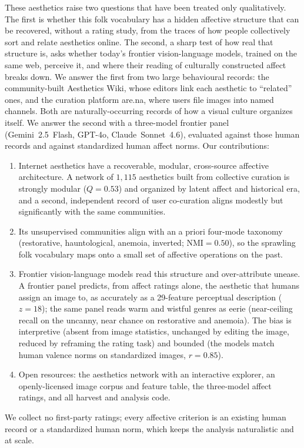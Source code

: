 \documentclass[11pt]{article}
\begin{document}
These aesthetics raise two questions that have been treated only qualitatively. The first is
whether this folk vocabulary has a hidden affective structure that can be recovered, without a
rating study, from the traces of how people collectively sort and relate aesthetics online. The
second, a sharp test of how real that structure is, asks whether today's frontier vision-language
models, trained on the same web, perceive it, and where their reading of culturally constructed
affect breaks down. We answer the first from
two large behavioural records: the community-built Aesthetics Wiki, whose editors link each
aesthetic to ``related'' ones, and the curation platform are.na, where users file images into
named channels. Both are naturally-occurring records of how a visual culture organizes itself. We
answer the second with a three-model frontier panel (Gemini~2.5~Flash, GPT-4o, Claude~Sonnet~4.6),
evaluated against those human records and against standardized human affect norms. Our
contributions:
\begin{enumerate}\itemsep2pt
  \item Internet aesthetics have a recoverable, modular, cross-source affective architecture. A
  network of $1{,}115$ aesthetics built from collective curation is strongly modular ($Q=0.53$) and
  organized by latent affect and historical era, and a second, independent record of user
  co-curation aligns modestly but significantly with the same communities.
  \item Its unsupervised communities align with an a priori four-mode taxonomy (restorative,
  hauntological, anemoia, inverted; $\mathrm{NMI}=0.50$), so the sprawling folk vocabulary maps onto
  a small set of affective operations on the past.
  \item Frontier vision-language models read this structure and over-attribute unease. A frontier
  panel predicts, from affect ratings alone, the aesthetic that humans assign an image to, as
  accurately as a 29-feature perceptual description ($z=18$); the same panel reads warm and wistful
  genres as eerie (near-ceiling recall on the uncanny, near chance on restorative and anemoia). The
  bias is interpretive (absent from image statistics, unchanged by editing the image, reduced by
  reframing the rating task) and bounded (the models match human valence norms on standardized
  images, $r=0.85$).
  \item Open resources: the aesthetics network with an interactive explorer, an openly-licensed
  image corpus and feature table, the three-model affect ratings, and all harvest and analysis code.
\end{enumerate}
We collect no first-party ratings; every affective criterion is an existing human record or a
standardized human norm, which keeps the analysis naturalistic and at scale.
\end{document}
